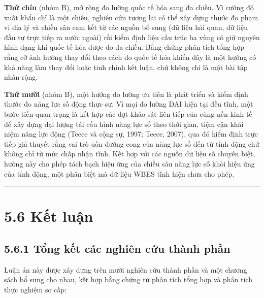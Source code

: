 \documentclass[
  a4paper,
  13pt]{extreport}
\begin{document}
\textbf{Thứ chín} (nhóm B), mở rộng đo lường quốc tế hóa sang đa chiều.
Vì cường độ xuất khẩu chỉ là một chiều, nghiên cứu tương lai có thể xây
dựng thước đo phạm vi địa lý và chiều sâu cam kết từ các nguồn bổ sung
(dữ liệu hải quan, dữ liệu đầu tư trực tiếp ra nước ngoài) rồi kiểm định
liệu cấu trúc ba vùng có giữ nguyên hình dạng khi quốc tế hóa được đo đa
chiều. Bằng chứng phân tích tổng hợp rằng cỡ ảnh hưởng thay đổi theo
cách đo quốc tế hóa khiến đây là một hướng có khả năng làm thay đổi hoặc
tinh chỉnh kết luận, chứ không chỉ là một bài tập nhân rộng.

\textbf{Thứ mười} (nhóm B), một hướng đo lường ưu tiên là phát triển và
kiểm định thước đo năng lực số động thực sự. Vì mọi đo lường DAI hiện
tại đều tĩnh, một bước tiến quan trọng là kết hợp các đợt khảo sát liên
tiếp của cùng nền kinh tế để xây dựng đại lượng tái cấu hình năng lực số
theo thời gian, tiệm cận khái niệm năng lực động (Teece và cộng sự,
1997; Teece, 2007), qua đó kiểm định trực tiếp giả thuyết rằng vai trò
uốn đường cong của năng lực số đến từ tính động chứ không chỉ từ mức
chấp nhận tĩnh. Kết hợp với các nguồn dữ liệu số chuyên biệt, hướng này
cho phép tách bạch hiệu ứng của chiều sâu năng lực số khỏi hiệu ứng của
tính động, một phân biệt mà dữ liệu WBES tĩnh hiện chưa cho phép.

\begin{center}\rule{0.5\linewidth}{0.5pt}\end{center}

\hypertarget{kux1ebft-luux1eadn}{%
\section{5.6 Kết luận}\label{kux1ebft-luux1eadn}}

\hypertarget{tux1ed5ng-kux1ebft-cuxe1c-nghiuxean-cux1ee9u-thuxe0nh-phux1ea7n}{%
\subsection{5.6.1 Tổng kết các nghiên cứu thành
phần}\label{tux1ed5ng-kux1ebft-cuxe1c-nghiuxean-cux1ee9u-thuxe0nh-phux1ea7n}}

Luận án này được xây dựng trên mười nghiên cứu thành phần và một chương
sách bổ sung cho nhau, kết hợp bằng chứng từ phân tích tổng hợp và phân
tích thực nghiệm sơ cấp:
\end{document}
